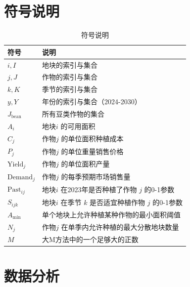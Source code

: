 \documentclass[withoutpreface,bwprint]{cumcmthesis} %
\begin{document}
\section{符号说明}

\begin{table}[H]
	\centering
	\caption{符号说明}
	\begin{tabular}{ll}
		\toprule
		符号                 & 说明                                \\
		\midrule

		$i, I$             & 地块的索引与集合                          \\
		$j, J$             & 作物的索引与集合                          \\
		$k, K$             & 季节的索引与集合                          \\
		$y, Y$             & 年份的索引与集合（2024-2030）               \\
		$J_{\text{bean}}$  & 所有豆类作物的集合                         \\

		$A_i$              & 地块$i$ 的可用面积                       \\
		$C_j$              & 作物$j$ 的单位面积种植成本                   \\
		$P_j$              & 作物$j$ 的单位重量销售价格                   \\
		$\text{Yield}_j$   & 作物$j$ 的单位面积产量                     \\
		$\text{Demand}_j$  & 作物$j$ 的每季预期市场销售量                  \\
		$\text{Past}_{ij}$ & 地块$i$ 在2023年是否种植了作物 $j$ 的0-1参数    \\
		$S_{ijk}$          & 地块$i$ 在季节 $k$ 是否适宜种植作物 $j$ 的0-1参数 \\
		$A_{\min}$         & 单个地块上允许种植某种作物的最小面积阈值              \\
		$N_j$              & 作物$j$ 在单季内允许种植的最大分散地块数量           \\
		$M$                & 大M方法中的一个足够大的正数                    \\
		\bottomrule
	\end{tabular}
\end{table}


\section{数据分析}
\end{document}
